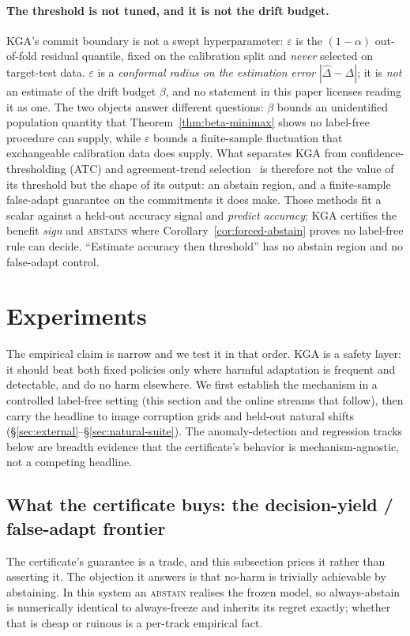 \documentclass[conference]{IEEEtran}
\theoremstyle{plain}
\theoremstyle{definition}
\begin{document}
\paragraph{The threshold is not tuned, and it is not the drift budget.} \textsc{KGA}'s commit
boundary is not a swept hyperparameter: $\varepsilon$ is the $(1-\alpha)$ out-of-fold residual
quantile, fixed on the calibration split and \emph{never} selected on target-test data.
$\varepsilon$ is a \emph{conformal radius on the estimation error}
$|\widehat\Delta-\Delta|$; it is \emph{not} an estimate of the drift budget $\beta$, and no
statement in this paper licenses reading it as one. The two objects answer different questions:
$\beta$ bounds an unidentified population quantity that Theorem~\ref{thm:beta-minimax} shows no
label-free procedure can supply, while $\varepsilon$ bounds a finite-sample fluctuation that
exchangeable calibration data does supply. What separates \textsc{KGA} from confidence-thresholding
(ATC) and agreement-trend selection~\cite{kim2024taol} is therefore not the value of its threshold
but the shape of its output: an abstain region, and a finite-sample false-adapt guarantee on the
commitments it does make. Those methods fit a scalar against a held-out accuracy signal and
\emph{predict accuracy}; \textsc{KGA} certifies the benefit \emph{sign} and \textsc{abstains} where
Corollary~\ref{cor:forced-abstain} proves no label-free rule can decide. ``Estimate accuracy then
threshold'' has no abstain region and no false-adapt control.




\section{Experiments}\label{sec:exp}
The empirical claim is narrow and we test it in that order. \textsc{KGA} is a safety layer: it
should beat both fixed policies only where harmful adaptation is frequent and detectable, and do no
harm elsewhere. We first establish the mechanism in a controlled label-free setting (this section
and the online streams that follow), then carry the headline to image corruption grids and held-out
natural shifts (\S\ref{sec:external}--\S\ref{sec:natural-suite}). The anomaly-detection and regression
tracks below are breadth evidence that the certificate's behavior is mechanism-agnostic, not a
competing headline.

\subsection{What the certificate buys: the decision-yield / false-adapt frontier}\label{sec:decision-value}
The certificate's guarantee is a trade, and this subsection prices it rather than asserting it. The
objection it answers is that no-harm is trivially achievable by abstaining. In this system an
\textsc{abstain} realises the frozen model, so always-abstain is numerically identical to
always-freeze and inherits its regret exactly; whether that is cheap or ruinous is a per-track
empirical fact.
\end{document}
